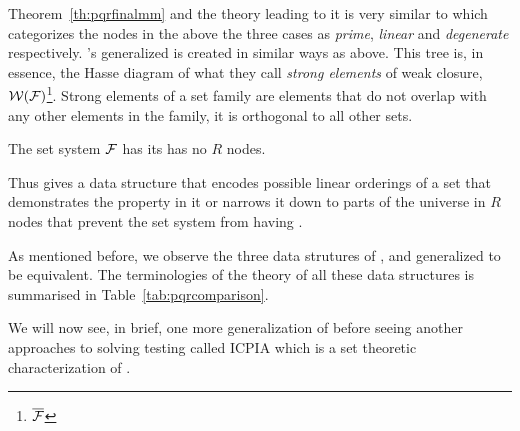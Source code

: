 Theorem~\ref{th:pqrfinalmm} and the theory leading to it is very
similar to \cite[esp. Th.~2.1, 3.5. also Th.~3.2, 3.3, 3.4]{mcc04}
which categorizes the nodes in the above the three cases as {\em
  prime}, {\em linear} and {\em degenerate}
respectively. \cite{mcc04}'s generalized \PQtree is created in similar
ways as \PQRtree above. This tree is, in essence, the Hasse diagram of
what they call {\em strong elements} of weak closure,
${\cal W}({\cal F})$\footnote{\ie $\overline{{\cal F}}$}. Strong elements of a set
family are elements that do not overlap with any other elements in the
family, \ie it is orthogonal to all other sets\cite[Def.~3.3]{mcc04}.

\begin{theoremsansproof}
The set system ${\cal F}$ has \COP \iff its \PQRtree has no $R$ nodes.  
\end{theoremsansproof}

Thus \PQRtree gives a data structure that encodes possible linear
orderings of a set that demonstrates the \COP property in it or
narrows it down to parts of the universe in $R$ nodes that prevent the
set system from having \COP.

As mentioned before, we observe the three data strutures of \PQRtree,
\gPQtree and generalized \PQtree to be equivalent. The terminologies
of the theory of all these data structures is summarised in
Table~\ref{tab:pqrcomparison}.

We will now see, in brief, one more generalization of \PQtree before
seeing another approaches to solving \COP testing called ICPIA which
is a set theoretic characterization of \COP.


